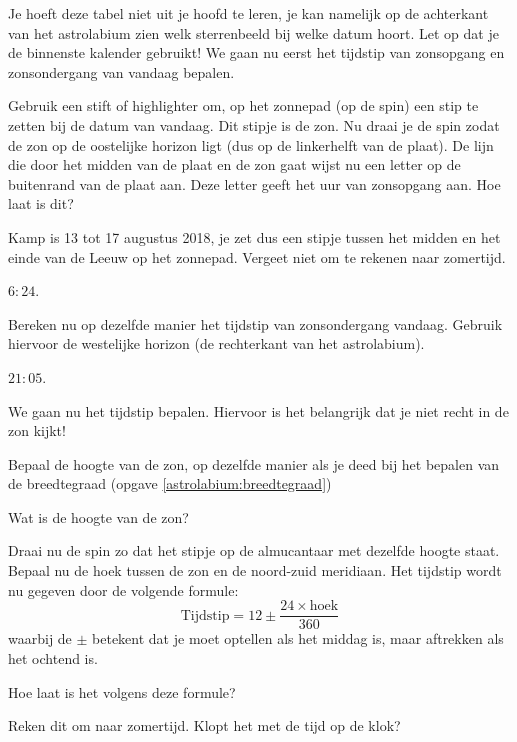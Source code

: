 Je hoeft deze tabel niet uit je hoofd te leren, je kan namelijk op de achterkant van het astrolabium zien welk sterrenbeeld bij welke datum hoort. Let op dat je de binnenste kalender gebruikt! We gaan nu eerst het tijdstip van zonsopgang en zonsondergang van vandaag bepalen. 
\begin{opgave}
 Gebruik een stift of highlighter om, op het zonnepad (op de spin) een stip te zetten bij de datum van vandaag. Dit stipje is de zon. Nu draai je de spin zodat de zon op de oostelijke horizon ligt (dus op de linkerhelft van de plaat). De lijn die door het midden van de plaat en de zon gaat wijst nu een letter op de buitenrand van de plaat aan. Deze letter geeft het uur van zonsopgang aan. Hoe laat is dit?
 \begin{hint}
  Kamp is 13 tot 17 augustus 2018, je zet dus een stipje tussen het midden en het einde van de Leeuw op het zonnepad. Vergeet niet om te rekenen naar zomertijd.
 \end{hint}
 \begin{antwoord}
  $6:24$.
 \end{antwoord}
\end{opgave}

\begin{opgave}
 Bereken nu op dezelfde manier het tijdstip van zonsondergang vandaag. Gebruik hiervoor de westelijke horizon (de rechterkant van het astrolabium). 
 \begin{antwoord}
  $21:05$.
 \end{antwoord}
\end{opgave}

We gaan nu het tijdstip bepalen. Hiervoor is het belangrijk dat je niet recht in de zon kijkt!
\begin{opgave}
 Bepaal de hoogte van de zon, op dezelfde manier als je deed bij het bepalen van de breedtegraad (opgave \ref{astrolabium:breedtegraad})
 \begin{subopgave}
 Wat is de hoogte van de zon?
 \end{subopgave}
 Draai nu de spin zo dat het stipje op de almucantaar met dezelfde hoogte staat. Bepaal nu de hoek tussen de zon en de noord-zuid meridiaan. Het tijdstip wordt nu gegeven door de volgende formule:
 \[ \textrm{Tijdstip} = 12 \pm \frac{24\times\textrm{hoek}}{360} \]
 waarbij de $\pm$ betekent dat je moet optellen als het middag is, maar aftrekken als het ochtend is.
 \begin{subopgave}
  Hoe laat is het volgens deze formule?
 \end{subopgave}
 \begin{subopgave}
  Reken dit om naar zomertijd. Klopt het met de tijd op de klok?
 \end{subopgave}
\end{opgave}

